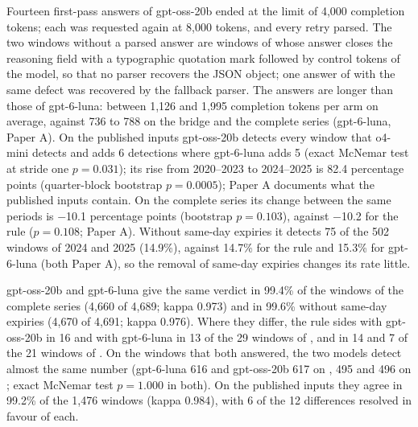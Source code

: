 Fourteen first-pass answers of gpt-oss-20b ended at the limit of 4{,}000 completion tokens; each was requested again at 8{,}000 tokens, and every retry parsed. The two windows without a parsed answer are windows of  whose answer closes the reasoning field with a typographic quotation mark followed by control tokens of the model, so that no parser recovers the JSON object; one answer of  with the same defect was recovered by the fallback parser. The answers are longer than those of gpt-6-luna: between 1{,}126 and 1{,}995 completion tokens per arm on average, against 736 to 788 on the bridge and the complete series (gpt-6-luna, Paper A). On the published inputs gpt-oss-20b detects every window that o4-mini detects and adds 6 detections where gpt-6-luna adds 5 (exact McNemar test at stride one $p=0.031$); its rise from 2020--2023 to 2024--2025 is 82.4 percentage points (quarter-block bootstrap $p=0.0005$); Paper A documents what the published inputs contain. On the complete series its change between the same periods is $-$10.1 percentage points (bootstrap $p=0.103$), against $-$10.2 for the rule ($p=0.108$; Paper A). Without same-day expiries it detects 75 of the 502 windows of 2024 and 2025 (14.9\%), against 14.7\% for the rule and 15.3\% for gpt-6-luna (both Paper A), so the removal of same-day expiries changes its rate little.

gpt-oss-20b and gpt-6-luna give the same verdict in 99.4\% of the windows of the complete series (4{,}660 of 4{,}689; kappa 0.973) and in 99.6\% without same-day expiries (4{,}670 of 4{,}691; kappa 0.976). Where they differ, the rule sides with gpt-oss-20b in 16 and with gpt-6-luna in 13 of the 29 windows of , and in 14 and 7 of the 21 windows of . On the windows that both answered, the two models detect almost the same number (gpt-6-luna 616 and gpt-oss-20b 617 on , 495 and 496 on ; exact McNemar test $p=1.000$ in both). On the published inputs they agree in 99.2\% of the 1{,}476 windows (kappa 0.984), with 6 of the 12 differences resolved in favour of each.

